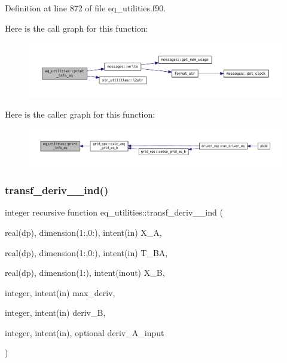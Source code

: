 Definition at line 872 of file eq\+\_\+utilities.\+f90.

Here is the call graph for this function\+:
\nopagebreak
\begin{figure}[H]
\begin{center}
\leavevmode
\includegraphics[width=350pt]{namespaceeq__utilities_a40f397d20b45432117744ca16870ddbb_cgraph}
\end{center}
\end{figure}
Here is the caller graph for this function\+:
\nopagebreak
\begin{figure}[H]
\begin{center}
\leavevmode
\includegraphics[width=350pt]{namespaceeq__utilities_a40f397d20b45432117744ca16870ddbb_icgraph}
\end{center}
\end{figure}
\mbox{\label{namespaceeq__utilities_af86031bb0a0aa17c93d160fe80931be7}} 
\subsubsection{\texorpdfstring{transf\+\_\+deriv\+\_\+\_\+ind()}{transf\_deriv\_1\_ind()}}
{\footnotesize\ttfamily integer recursive function eq\+\_\+utilities\+::transf\+\_\+deriv\+\_\+\_\+ind (\begin{DoxyParamCaption}\item[{real(dp), dimension(1\+:,0\+:), intent(in)}]{X\+\_\+A,  }\item[{real(dp), dimension(1\+:,0\+:), intent(in)}]{T\+\_\+\+BA,  }\item[{real(dp), dimension(1\+:), intent(inout)}]{X\+\_\+B,  }\item[{integer, intent(in)}]{max\+\_\+deriv,  }\item[{integer, intent(in)}]{deriv\+\_\+B,  }\item[{integer, intent(in), optional}]{deriv\+\_\+\+A\+\_\+input }\end{DoxyParamCaption})}



